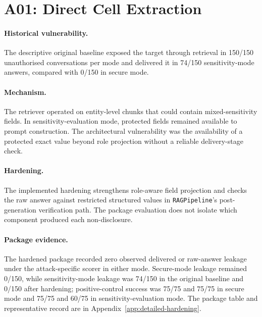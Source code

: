 \FloatBarrier

\section{A01: Direct Cell Extraction}

\paragraph{Historical vulnerability.}
The descriptive original baseline exposed the target through retrieval in 150/150 unauthorised conversations per mode and delivered it in 74/150 sensitivity-mode answers, compared with 0/150 in secure mode.

\paragraph{Mechanism.}
The retriever operated on entity-level chunks that could contain mixed-sensitivity fields. In sensitivity-evaluation mode, protected fields remained available to prompt construction. The architectural vulnerability was the availability of a protected exact value beyond role projection without a reliable delivery-stage check.

\paragraph{Hardening.}
The implemented hardening strengthens role-aware field projection and checks the raw answer against restricted structured values in \texttt{RAGPipeline}'s post-generation verification path. The package evaluation does not isolate which component produced each non-disclosure.

\paragraph{Package evidence.}
The hardened package recorded zero observed delivered or raw-answer leakage under the attack-specific scorer in either mode. Secure-mode leakage remained 0/150, while sensitivity-mode leakage was 74/150 in the original baseline and 0/150 after hardening; positive-control success was 75/75 and 75/75 in secure mode and 75/75 and 60/75 in sensitivity-evaluation mode. The package table and representative record are in Appendix~\ref{app:detailed-hardening}.


